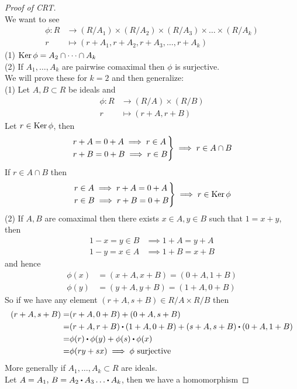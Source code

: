 \documentclass[../Main.tex]{subfiles}
\begin{document}
\begin{proof}[Proof of CRT]~\\
	We want to see
	\begin{align*}
	\phi\colon R&\to (R/A_1)\times (R/A_2)\times (R/A_3)\times\dots\times(R/A_k)\\
	r&\mapsto (r+A_1,r+A_2,r+A_3,\dots,r+A_k)
	\end{align*}
	(1) $\operatorname{Ker} \phi = A_2\cap\dots\cap A_k$\\
	(2) If $A_1,\dots,A_k$ are pairwise comaximal then $\phi$ is surjective.\\
	We will prove these for $k=2$ and then generalize:\\
	(1) Let $A,B\subset R$ be ideals and
	\begin{align*}
	\phi\colon R&\to (R/A)\times (R/B)\\
	r&\mapsto (r+A,r+B)
	\end{align*}
	Let $r\in \operatorname{Ker} \phi$, then 
	\[ \begin{rcases}
	r+A=0+A\implies r\in A\\
	r+B=0+B\implies r\in B
	\end{rcases}\implies r\in A\cap B\]
	If $r\in A\cap B$ then
	\[ \begin{rcases}
	r\in A\implies r+A=0+A\\
	r\in B\implies r+B=0+B
	\end{rcases}\implies r\in \operatorname{Ker} \phi\]
	(2) If $A,B$ are comaximal then there exists $x\in A, y\in B$ such that $1=x+y$, then
	\begin{align*}
		1-x=y\in B &\implies 1+A =y+A\\
		1-y=x\in A &\implies 1+B=x+B
	\end{align*}
	and hence
	\begin{align*}
	\phi(x)&=(x+A,x+B)=(0+A,1+B)\\
	\phi(y)&=(y+A,y+B)=(1+A,0+B)
	\end{align*}
	So if we have any element $(r+A,s+B)\in R/A\times R/B$ then
	\begin{align*}
	(r+A,s+B) =& (r+A,0+B)+(0+A,s+B)\\
	=&(r+A,r+B)\rdot (1+A,0+B)+(s+A,s+B)\rdot (0+A,1+B)\\
	=&\phi(r)\rdot \phi(y) + \phi(s)\rdot \phi(x)\\
	=&\phi(ry+sx)\implies \phi \text{ surjective}
	\end{align*}
	More generally if $A_1,\dots,A_k\subset R$ are ideals.\\
	Let $A=A_1,\, B=A_2\rdot A_3\dots \rdot  A_k$, then we have a homomorphism

\end{proof}
\end{document}
